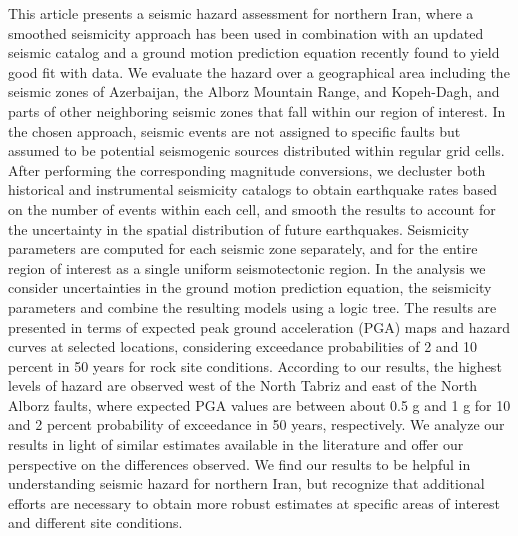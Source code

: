 %
This article presents a seismic hazard assessment for northern Iran, where a smoothed seismicity approach has been used in combination with an updated seismic catalog and a ground motion prediction equation recently found to yield good fit with data. We evaluate the hazard over a geographical area including the seismic zones of Azerbaijan, the Alborz Mountain Range, and Kopeh-Dagh, and parts of other neighboring seismic zones that fall within our region of interest. In the chosen approach, seismic events are not assigned to specific faults but assumed to be potential seismogenic sources distributed within regular grid cells. After performing the corresponding magnitude conversions, we decluster both historical and instrumental seismicity catalogs to obtain earthquake rates based on the number of events within each cell, and smooth the results to account for the uncertainty in the spatial distribution of future earthquakes. Seismicity parameters are computed for each seismic zone separately, and for the entire region of interest as a single uniform seismotectonic region. In the analysis we consider uncertainties in the ground motion prediction equation, the seismicity parameters and combine the resulting models using a logic tree. The results are presented in terms of expected peak ground acceleration (PGA) maps and hazard curves at selected locations, considering exceedance probabilities of 2 and 10 percent in 50 years for rock site conditions. According to our results, the highest levels of hazard are observed west of the North Tabriz and east of the North Alborz faults, where expected PGA values are between about 0.5 g and 1 g for 10 and 2 percent probability of exceedance in 50 years, respectively. We analyze our results in light of similar estimates available in the literature and offer our perspective on the differences observed. We find our results to be helpful in understanding seismic hazard for northern Iran, but recognize that additional efforts are necessary to obtain more robust estimates at specific areas of interest and different site conditions.
